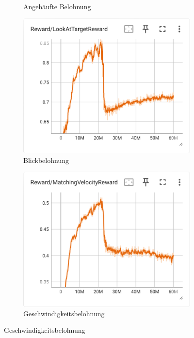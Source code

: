 \begin{figure}[H]
\begin{subfigure}{.49\textwidth}
      \caption{Angehäufte Belohnung}
      \label{fig:134_cumulative_reward}
    \end{subfigure}
     \begin{subfigure}{.49\textwidth}
      \centering  
      \includegraphics[width=\textwidth]{img/134_look_reward}
      \caption{Blickbelohnung}
      \label{fig:134_look_reward}
    \end{subfigure}
    \begin{subfigure}{.49\textwidth}
      \centering  
      \includegraphics[width=\textwidth]{img/134_vel_reward}
      \caption{Geschwindigkeitsbelohnung}

\end{subfigure}
\end{figure}
